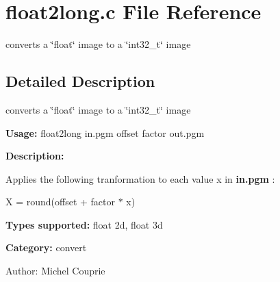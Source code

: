 \section{float2long.c File Reference}
\label{float2long_8c}
converts a \char`\"{}float\char`\"{} image to a \char`\"{}int32\_\-t\char`\"{} image  




\label{_details}
\subsection{Detailed Description}
converts a \char`\"{}float\char`\"{} image to a \char`\"{}int32\_\-t\char`\"{} image 

{\bf Usage:} float2long in.pgm offset factor out.pgm

{\bf Description:}

Applies the following tranformation to each value x in {\bf in.pgm} :

X = round(offset + factor $\ast$ x)

{\bf Types supported:} float 2d, float 3d

{\bf Category:} convert

\begin{Desc}
\item[Author:]Michel Couprie \end{Desc}
